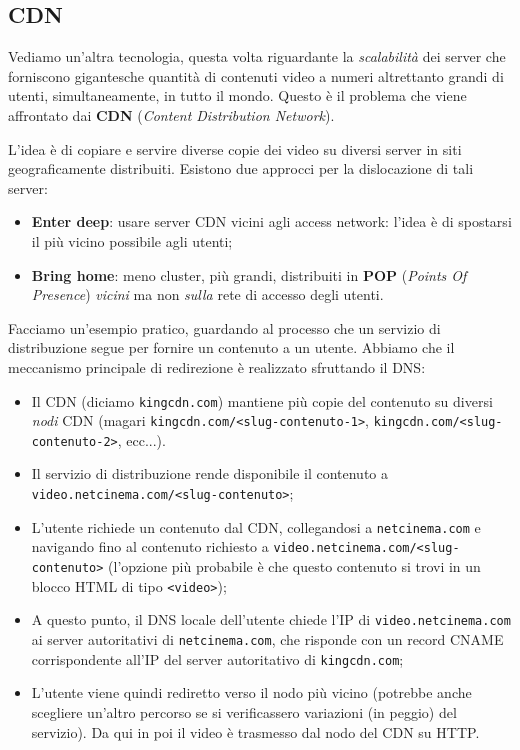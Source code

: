 \documentclass[a4paper,11pt]{article}
\begin{document}
\subsection{CDN}
Vediamo un'altra tecnologia, questa volta riguardante la \textit{scalabilità} dei server che forniscono gigantesche quantità di contenuti video a numeri altrettanto grandi di utenti, simultaneamente, in tutto il mondo.
Questo è il problema che viene affrontato dai \textbf{CDN} (\textit{Content Distribution Network}).

L'idea è di copiare e servire diverse copie dei video su diversi server in siti geograficamente distribuiti.
Esistono due approcci per la dislocazione di tali server:
\begin{itemize}
	\item \textbf{Enter deep}: usare server CDN vicini agli access network: l'idea è di spostarsi il più vicino possibile agli utenti;
	\item \textbf{Bring home}: meno cluster, più grandi, distribuiti in \textbf{POP} (\textit{Points Of Presence}) \textit{vicini} ma non \textit{sulla} rete di accesso degli utenti. 
\end{itemize}

Facciamo un'esempio pratico, guardando al processo che un servizio di distribuzione segue per fornire un contenuto a un utente.
Abbiamo che il meccanismo principale di redirezione è realizzato sfruttando il DNS:
\begin{itemize}
	\item Il CDN (diciamo \lstinline|kingcdn.com|) mantiene più copie del contenuto su diversi \textit{nodi} CDN (magari \lstinline|kingcdn.com/<slug-contenuto-1>|, \lstinline|kingcdn.com/<slug-contenuto-2>|, ecc...). 
	\item Il servizio di distribuzione rende disponibile il contenuto a \lstinline|video.netcinema.com/<slug-contenuto>|;
	\item L'utente richiede un contenuto dal CDN, collegandosi a \lstinline|netcinema.com| e navigando fino al contenuto richiesto a \lstinline|video.netcinema.com/<slug-contenuto>| (l'opzione più probabile è che questo contenuto si trovi in un blocco HTML di tipo \lstinline|<video>|);
	\item A questo punto, il DNS locale dell'utente chiede l'IP di \lstinline|video.netcinema.com| ai server autoritativi di \lstinline|netcinema.com|, che risponde con un record CNAME corrispondente all'IP del server autoritativo di \lstinline|kingcdn.com|;
		\item L'utente viene quindi rediretto verso il nodo più vicino (potrebbe anche scegliere un'altro percorso se si verificassero variazioni (in peggio) del servizio). Da qui in poi il video è trasmesso dal nodo del CDN su HTTP.
\end{itemize}
\end{document}
